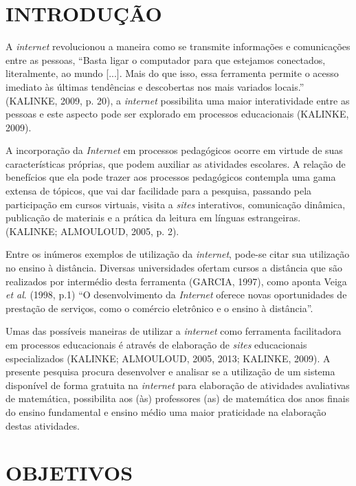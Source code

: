 \documentclass{IFNMG}
\begin{document}
\sumario

% 
\section{INTRODUÇÃO}
A \textit{internet} revolucionou a maneira como se transmite informações e comunicações entre as pessoas, “Basta ligar o computador para que estejamos conectados, literalmente, ao mundo [...]. Mais do que isso, essa ferramenta permite o acesso imediato às últimas tendências e descobertas nos mais variados locais.” (KALINKE, 2009, p. 20), a \textit{internet} possibilita uma maior interatividade entre as pessoas e este aspecto pode ser explorado em processos educacionais (KALINKE, 2009).
	\begin{CitacaoLonga} 
A incorporação da \textit{Internet} em processos pedagógicos ocorre em virtude de suas características próprias, que podem auxiliar as atividades escolares. A relação de benefícios que ela pode trazer aos processos pedagógicos contempla uma gama extensa de tópicos, que vai dar facilidade para a pesquisa, passando pela participação em cursos virtuais, visita a \textit{sites} interativos, comunicação dinâmica, publicação de materiais e a prática da leitura em línguas estrangeiras. (KALINKE; ALMOULOUD, 2005, p. 2).
	\end{CitacaoLonga} 
Entre os inúmeros exemplos de utilização da \textit{internet}, pode-se citar sua utilização no ensino à distância. Diversas universidades ofertam cursos a distância que são realizados por intermédio desta ferramenta (GARCIA, 1997), como aponta Veiga \textit{et al}. (1998, p.1) “O desenvolvimento da \textit{Internet} oferece novas oportunidades de prestação de serviços, como o comércio eletrônico e o ensino à distância”.

Umas das possíveis maneiras de utilizar a \textit{internet} como ferramenta facilitadora em processos educacionais é através de elaboração de \textit{sites} educacionais especializados (KALINKE; ALMOULOUD, 2005, 2013; KALINKE, 2009). A presente pesquisa procura desenvolver e analisar se a utilização de um sistema disponível de forma gratuita na \textit{internet} para elaboração de atividades avaliativas de matemática, possibilita aos (às) professores (as) de matemática dos anos finais do ensino fundamental e ensino médio uma maior praticidade na elaboração destas atividades.

\newpage
\section{OBJETIVOS}
\end{document}
